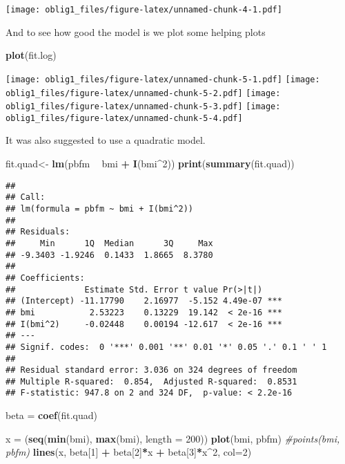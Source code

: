 \documentclass[
]{article}
\newenvironment{Shaded}{\begin{snugshade}}{\end{snugshade}}
\newcommand{\CommentTok}[1]{\textcolor[rgb]{0.56,0.35,0.01}{\textit{#1}}}
\newcommand{\DataTypeTok}[1]{\textcolor[rgb]{0.13,0.29,0.53}{#1}}
\newcommand{\DecValTok}[1]{\textcolor[rgb]{0.00,0.00,0.81}{#1}}
\newcommand{\KeywordTok}[1]{\textcolor[rgb]{0.13,0.29,0.53}{\textbf{#1}}}
\newcommand{\NormalTok}[1]{#1}
\newcommand{\OperatorTok}[1]{\textcolor[rgb]{0.81,0.36,0.00}{\textbf{#1}}}
\newcommand{\StringTok}[1]{\textcolor[rgb]{0.31,0.60,0.02}{#1}}
\begin{document}
\texttt{[image: oblig1\_files/figure-latex/unnamed-chunk-4-1.pdf]}

And to see how good the model is we plot some helping plots

\begin{Shaded}
\begin{Highlighting}[]
\KeywordTok{plot}\NormalTok{(fit.log)}
\end{Highlighting}
\end{Shaded}

\texttt{[image: oblig1\_files/figure-latex/unnamed-chunk-5-1.pdf]}
\texttt{[image: oblig1\_files/figure-latex/unnamed-chunk-5-2.pdf]}
\texttt{[image: oblig1\_files/figure-latex/unnamed-chunk-5-3.pdf]}
\texttt{[image: oblig1\_files/figure-latex/unnamed-chunk-5-4.pdf]}

It was also suggested to use a quadratic model.

\begin{Shaded}
\begin{Highlighting}[]
\NormalTok{fit.quad<-}\StringTok{ }\KeywordTok{lm}\NormalTok{(pbfm }\OperatorTok{~}\StringTok{ }\NormalTok{bmi }\OperatorTok{+}\StringTok{ }\KeywordTok{I}\NormalTok{(bmi}\OperatorTok{^}\DecValTok{2}\NormalTok{))}
\KeywordTok{print}\NormalTok{(}\KeywordTok{summary}\NormalTok{(fit.quad))}
\end{Highlighting}
\end{Shaded}

\begin{verbatim}
## 
## Call:
## lm(formula = pbfm ~ bmi + I(bmi^2))
## 
## Residuals:
##     Min      1Q  Median      3Q     Max 
## -9.3403 -1.9246  0.1433  1.8665  8.3780 
## 
## Coefficients:
##              Estimate Std. Error t value Pr(>|t|)    
## (Intercept) -11.17790    2.16977  -5.152 4.49e-07 ***
## bmi           2.53223    0.13229  19.142  < 2e-16 ***
## I(bmi^2)     -0.02448    0.00194 -12.617  < 2e-16 ***
## ---
## Signif. codes:  0 '***' 0.001 '**' 0.01 '*' 0.05 '.' 0.1 ' ' 1
## 
## Residual standard error: 3.036 on 324 degrees of freedom
## Multiple R-squared:  0.854,  Adjusted R-squared:  0.8531 
## F-statistic: 947.8 on 2 and 324 DF,  p-value: < 2.2e-16
\end{verbatim}

\begin{Shaded}
\begin{Highlighting}[]
\NormalTok{beta =}\StringTok{ }\KeywordTok{coef}\NormalTok{(fit.quad)}

\NormalTok{x =}\StringTok{ }\NormalTok{(}\KeywordTok{seq}\NormalTok{(}\KeywordTok{min}\NormalTok{(bmi), }\KeywordTok{max}\NormalTok{(bmi), }\DataTypeTok{length =} \DecValTok{200}\NormalTok{))}
\KeywordTok{plot}\NormalTok{(bmi, pbfm)}
\CommentTok{#points(bmi, pbfm)}
\KeywordTok{lines}\NormalTok{(x, beta[}\DecValTok{1}\NormalTok{] }\OperatorTok{+}\StringTok{ }\NormalTok{beta[}\DecValTok{2}\NormalTok{]}\OperatorTok{*}\NormalTok{x }\OperatorTok{+}\StringTok{ }\NormalTok{beta[}\DecValTok{3}\NormalTok{]}\OperatorTok{*}\NormalTok{x}\OperatorTok{^}\DecValTok{2}\NormalTok{, }\DataTypeTok{col=}\DecValTok{2}\NormalTok{)}
\end{Highlighting}
\end{Shaded}
\end{document}
